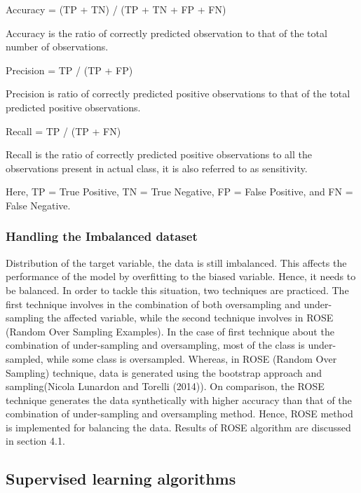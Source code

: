 \documentclass[
  a4paper,
]{article}
\begin{document}
\bigskip

Accuracy = (TP + TN) / (TP + TN + FP + FN)

Accuracy is the ratio of correctly predicted observation to that of the
total number of observations.

Precision = TP / (TP + FP)

Precision is ratio of correctly predicted positive observations to that
of the total predicted positive observations.

Recall = TP / (TP + FN)

Recall is the ratio of correctly predicted positive observations to all
the observations present in actual class, it is also referred to as
sensitivity.

Here, TP = True Positive, TN = True Negative, FP = False Positive, and
FN = False Negative.

\hypertarget{handling-the-imbalanced-dataset}{%
\subsubsection{Handling the Imbalanced
dataset}\label{handling-the-imbalanced-dataset}}

Distribution of the target variable, the data is still imbalanced. This
affects the performance of the model by overfitting to the biased
variable. Hence, it needs to be balanced. In order to tackle this
situation, two techniques are practiced. The first technique involves in
the combination of both oversampling and under-sampling the affected
variable, while the second technique involves in ROSE (Random Over
Sampling Examples). In the case of first technique about the combination
of under-sampling and oversampling, most of the class is under-sampled,
while some class is oversampled. Whereas, in ROSE (Random Over Sampling)
technique, data is generated using the bootstrap approach and
sampling(Nicola Lunardon and Torelli (2014)). On comparison, the ROSE
technique generates the data synthetically with higher accuracy than
that of the combination of under-sampling and oversampling method.
Hence, ROSE method is implemented for balancing the data. Results of
ROSE algorithm are discussed in section 4.1.

\hypertarget{supervised-learning-algorithms}{%
\subsection{Supervised learning
algorithms}\label{supervised-learning-algorithms}}
\end{document}
